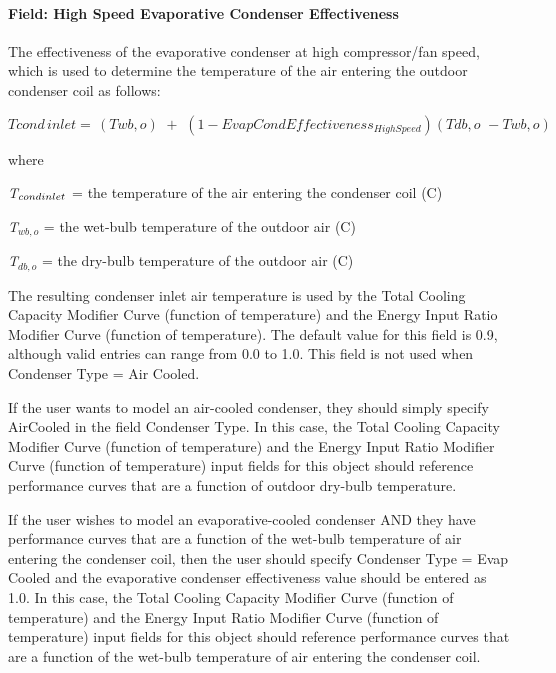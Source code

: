 \paragraph{Field: High Speed Evaporative Condenser Effectiveness}\label{field-high-speed-evaporative-condenser-effectiveness}

The effectiveness of the evaporative condenser at high compressor/fan speed, which is used to determine the temperature of the air entering the outdoor condenser coil as follows:

\begin{equation}
Tcond\,inlet = \,\left( {Twb,o} \right)\,\, + \,\,\left( {1 - EvapCondEffectivenes{s_{HighSpeed}}} \right)\left( {Tdb,o\,\, - Twb,o} \right)
\end{equation}

where

\emph{T\(_{cond\\ inlet}\)} = the temperature of the air entering the condenser coil (C)

\emph{T\(_{wb,o}\)} = the wet-bulb temperature of the outdoor air (C)

\emph{T\(_{db,o}\)} = the dry-bulb temperature of the outdoor air (C)

The resulting condenser inlet air temperature is used by the Total Cooling Capacity Modifier Curve (function of temperature) and the Energy Input Ratio Modifier Curve (function of temperature). The default value for this field is 0.9, although valid entries can range from 0.0 to 1.0. This field is not used when Condenser Type = Air Cooled.

If the user wants to model an air-cooled condenser, they should simply specify AirCooled in the field Condenser Type. In this case, the Total Cooling Capacity Modifier Curve (function of temperature) and the Energy Input Ratio Modifier Curve (function of temperature) input fields for this object should reference performance curves that are a function of outdoor dry-bulb temperature.

If the user wishes to model an evaporative-cooled condenser AND they have performance curves that are a function of the wet-bulb temperature of air entering the condenser coil, then the user should specify Condenser Type = Evap Cooled and the evaporative condenser effectiveness value should be entered as 1.0. In this case, the Total Cooling Capacity Modifier Curve (function of temperature) and the Energy Input Ratio Modifier Curve (function of temperature) input fields for this object should reference performance curves that are a function of the wet-bulb temperature of air entering the condenser coil.

